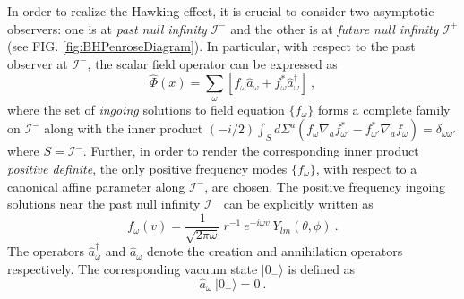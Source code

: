\documentclass[aps,twocolumn,showpacs]{revtex4}
\def\scriplus{\mathscr{I}^{+}}
\def\scriminus{\mathscr{I}^{-}}
\begin{document}
In order to realize the Hawking effect, it is crucial to consider two 
asymptotic observers: one is at \emph{past null infinity} $\scriminus$ and the 
other is at \emph{future null infinity} $\scriplus$ 
(see FIG. \ref{fig:BHPenroseDiagram}). In particular, with respect to the past 
observer at $\scriminus$, the scalar field operator can be expressed as 
%
\begin{equation}\label{ScalarFieldPastOperator}
\hat{\Phi}(x) = \sum_{\omega} \left[ 
{f}_{\omega} \hat{a}_{\omega} + {f}^{*}_{\omega} \hat{a}^{\dagger}_{\omega} 
\right] ~,
\end{equation}
%
where the set of \emph{ingoing} solutions to field equation $\{{f}_{\omega}\}$ 
forms a complete family on $\scriminus$ along with the inner product
$(-i/2)\int_{S}d\Sigma^{a} \left({f}_{\omega} \nabla_a 
{f}^{*}_{\omega'} -
{f}^{*}_{\omega'} \nabla_a {f}_{\omega} \right) = \delta_{\omega\omega'}$ 
where $S=\scriminus$.
%
Further, in order to render the corresponding inner product \emph{positive 
definite}, the only positive frequency modes $\{{f}_{\omega}\}$, with respect 
to a canonical affine parameter along $\scriminus$, are chosen. The positive 
frequency ingoing solutions near the past null infinity $\scriminus$ can be 
explicitly written as
%
\begin{equation}\label{IngoingSolution}
{f}_{\omega}(v) = \frac{1}{\sqrt{2\pi\omega}} ~ r^{-1}~ 
e^{-i\omega v} ~Y_{lm}(\theta,\phi) ~.
\end{equation}
%
The operators $\hat{a}^{\dagger}_{\omega}$ and $\hat{a}_{\omega}$ denote the 
creation and annihilation operators respectively. The corresponding vacuum state 
$|0_{-}\rangle$ is defined as
%
\begin{equation}\label{VacuumMinus}
\hat{a}_{\omega}~|0_{-}\rangle = 0 ~.
\end{equation}
%
\end{document}
